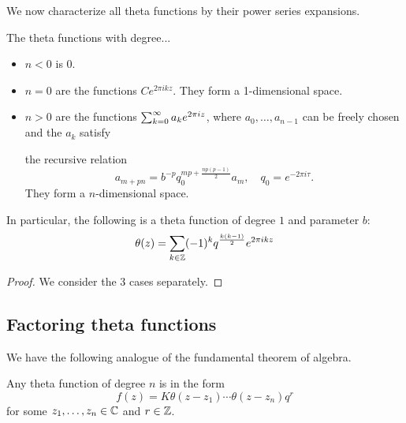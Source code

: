 We now characterize all theta functions by their power series expansions.
\begin{pr}
The theta functions with degree...
\begin{itemize}
\item
$n<0$ is 0.
\item
$n=0$ are the functions $Ce^{2\pi i kz}$. They form a 1-dimensional space.
\item
$n>0$ are the functions $\sum_{k=0}^{\infty} a_k e^{2\pi i z}$, where $a_0,\ldots, a_{n-1}$ can be freely chosen and the $a_k$ satisfy %

the recursive relation
\[
a_{m+pn}=b^{-p}q_0^{mp+\frac{np(p-1)}2}a_m,\quad q_0=e^{-2\pi i \tau}.
\]
They form a $n$-dimensional space.
\end{itemize}
In particular, the following is a theta function of degree $1$ and parameter $b$:
\[
\theta(z)=\sum_{k\in \Z} (-1)^k q^{\frac{k(k-1)}2}e^{2\pi i kz}%
\]
\end{pr}
\begin{proof}
We consider the 3 cases separately.
\end{proof}
\subsection{Factoring theta functions}
We have the following analogue of the fundamental theorem of algebra.
\begin{thm}
Any theta function of degree $n$ is in the form
\[
f(z)=K\theta(z-z_1)\cdots \theta(z-z_n)q^r
\]
for some $z_1,\ldots, z_n\in \mathbb{C}$ and $r\in \mathbb{Z}$.
\end{thm}


